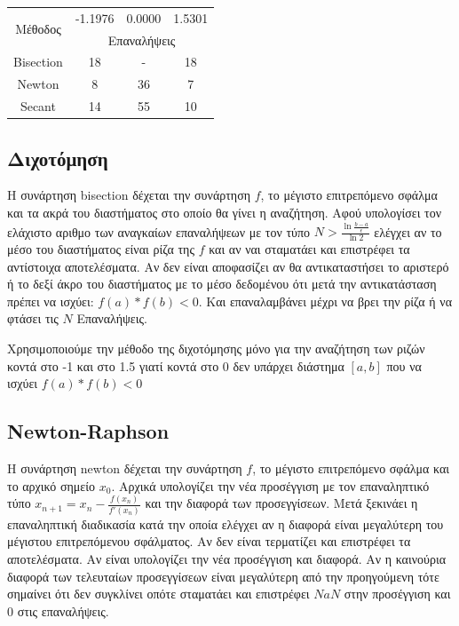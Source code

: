 \documentclass[a4paper,11pt]{article}
\begin{document}
\begin{flushleft}
    
    
    \begin{table}[h]
        \centering
    \begin{tabular}{|c|c|c|c|}
        \hline
        \multirow{2}{*}{Μέθοδος} & -1.1976 & 0.0000 & 1.5301 \\ \cline{2-4}  & \multicolumn{3}{c|}{Επαναλήψεις} \\
        \hline
        Bisection & 18 & - & 18 \\ \hline
        Newton & 8 & 36 & 7 \\  \hline
        Secant & 14 & 55 & 10 \\ \hline
    \end{tabular}
\end{table}

\subsection*{Διχοτόμηση}
Η συνάρτηση bisection δέχεται την συνάρτηση $f$, το μέγιστο επιτρεπόμενο σφάλμα και τα ακρά του διαστήματος στο οποίο θα γίνει η αναζήτηση. Αφού υπολογίσει τον ελάχιστο αριθμο των αναγκαίων επαναλήψεων με τον τύπο 
$N > \frac{\ln{\frac{b-a}{\epsilon}}}{\ln{2}}$ 
ελέγχει αν το μέσο του διαστήματος είναι ρίζα της $f$ και αν ναι σταματάει και επιστρέφει τα αντίστοιχα αποτελέσματα. Αν δεν είναι αποφασίζει αν θα αντικαταστήσει το αριστερό ή το δεξί άκρο του διαστήματος με το μέσο δεδομένου ότι μετά την αντικατάσταση πρέπει να ισχύει: $f(a)*f(b)<0$. Και επαναλαμβάνει μέχρι να βρει την ρίζα ή να φτάσει τις $N$ Επαναλήψεις.
\linebreak

Χρησιμοποιούμε την μέθοδο της διχοτόμησης μόνο για την αναζήτηση των ριζών κοντά στο -1 και στο 1.5 γιατί κοντά στο 0 δεν υπάρχει διάστημα $[a,b]$ που να ισχύει $f(a)*f(b)<0$
\linebreak

\subsection*{Newton-Raphson}
Η συνάρτηση newton δέχεται την συνάρτηση $f$, το μέγιστο επιτρεπόμενο σφάλμα και το αρχικό σημείο $x_0$. Αρχικά υπολογίζει την νέα προσέγγιση με τον επαναληπτικό τύπο $x_{n+1} = x_n-\frac{f(x_n)}{f'(x_n)}$ και την διαφορά των προσεγγίσεων. Μετά ξεκινάει η επαναληπτική διαδικασία κατά την οποία ελέγχει αν η διαφορά είναι μεγαλύτερη του μέγιστου επιτρεπόμενου σφάλματος. Αν δεν είναι τερματίζει και επιστρέφει τα αποτελέσματα. Αν είναι υπολογίζει την νέα προσέγγιση και διαφορά. Αν η καινούρια διαφορά των τελευταίων προσεγγίσεων είναι μεγαλύτερη από την προηγούμενη τότε σημαίνει ότι δεν συγκλίνει οπότε σταματάει και επιστρέφει $NaN$ στην προσέγγιση και $0$ στις επαναλήψεις.
\linebreak


\end{flushleft}
\end{document}
